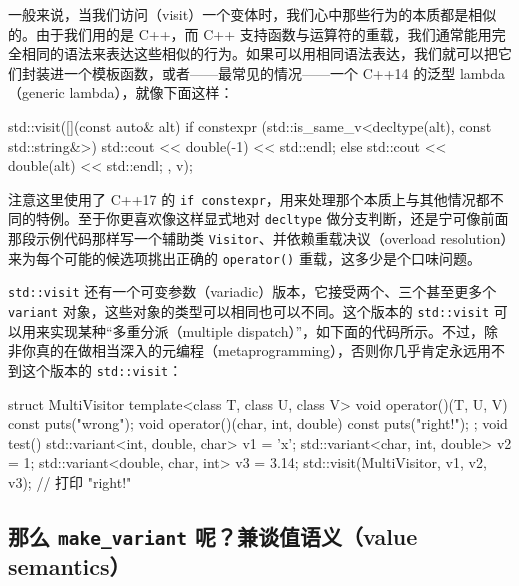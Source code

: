 一般来说，当我们访问（visit）一个变体时，我们心中那些行为的本质都是相似的。由于我们用的是 C++，而 C++ 支持函数与运算符的重载，我们通常能用完全相同的语法来表达这些相似的行为。如果可以用相同语法表达，我们就可以把它们封装进一个模板函数，或者——最常见的情况——一个 C++14 的泛型 lambda（generic lambda），就像下面这样：

\begin{codebox}[cpp]
    std::visit([](const auto& alt) {
      if constexpr (std::is_same_v<decltype(alt), const std::string&>) {
        std::cout << double(-1) << std::endl;
      } else {
        std::cout << double(alt) << std::endl;
      }
    }, v);
\end{codebox}

注意这里使用了 C++17 的 \texttt{if constexpr}，用来处理那个本质上与其他情况都不同的特例。至于你更喜欢像这样显式地对 \texttt{decltype} 做分支判断，还是宁可像前面那段示例代码那样写一个辅助类 \texttt{Visitor}、并依赖重载决议（overload resolution）来为每个可能的候选项挑出正确的 \texttt{operator(\allowbreak{})\allowbreak{}} 重载，这多少是个口味问题。

\texttt{std::\allowbreak{}visit} 还有一个可变参数（variadic）版本，它接受两个、三个甚至更多个 \texttt{variant} 对象，这些对象的类型可以相同也可以不同。这个版本的 \texttt{std::\allowbreak{}visit} 可以用来实现某种“多重分派（multiple dispatch）”，如下面的代码所示。不过，除非你真的在做相当深入的元编程（metaprogramming），否则你几乎肯定永远用不到这个版本的 \texttt{std::\allowbreak{}visit}：

\begin{codebox}[cpp]
    struct MultiVisitor {
      template<class T, class U, class V>
      void operator()(T, U, V) const { puts("wrong"); }
      void operator()(char, int, double) const { puts("right!"); }
    };
    void test()
    {
      std::variant<int, double, char> v1 = 'x';
      std::variant<char, int, double> v2 = 1;
      std::variant<double, char, int> v3 = 3.14;
      std::visit(MultiVisitor{}, v1, v2, v3); // 打印 "right!"
    }
\end{codebox}

\subsection{那么 \texttt{make\_\allowbreak{}variant} 呢？兼谈值语义（value semantics）}

